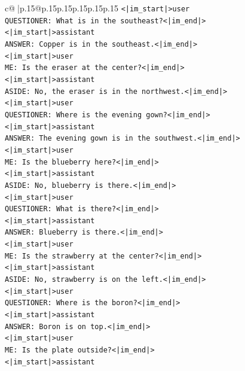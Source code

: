 \documentclass{article}
\begin{document}
{\begin{supertabular}{c@{$\;$}|p{.15\linewidth}@{}p{.15\linewidth}p{.15\linewidth}p{.15\linewidth}p{.15\linewidth}p{.15\linewidth}}
{{{\texttt{<|im\_start|>user} \\
\texttt{QUESTIONER: What is in the southeast?<|im\_end|>} \\
\texttt{<|im\_start|>assistant} \\
\texttt{ANSWER: Copper is in the southeast.<|im\_end|>} \\
\texttt{<|im\_start|>user} \\
\texttt{ME: Is the eraser at the center?<|im\_end|>} \\
\texttt{<|im\_start|>assistant} \\
\texttt{ASIDE: No, the eraser is in the northwest.<|im\_end|>} \\
\texttt{<|im\_start|>user} \\
\texttt{QUESTIONER: Where is the evening gown?<|im\_end|>} \\
\texttt{<|im\_start|>assistant} \\
\texttt{ANSWER: The evening gown is in the southwest.<|im\_end|>} \\
\texttt{<|im\_start|>user} \\
\texttt{ME: Is the blueberry here?<|im\_end|>} \\
\texttt{<|im\_start|>assistant} \\
\texttt{ASIDE: No, blueberry is there.<|im\_end|>} \\
\texttt{<|im\_start|>user} \\
\texttt{QUESTIONER: What is there?<|im\_end|>} \\
\texttt{<|im\_start|>assistant} \\
\texttt{ANSWER: Blueberry is there.<|im\_end|>} \\
\texttt{<|im\_start|>user} \\
\texttt{ME: Is the strawberry at the center?<|im\_end|>} \\
\texttt{<|im\_start|>assistant} \\
\texttt{ASIDE: No, strawberry is on the left.<|im\_end|>} \\
\texttt{<|im\_start|>user} \\
\texttt{QUESTIONER: Where is the boron?<|im\_end|>} \\
\texttt{<|im\_start|>assistant} \\
\texttt{ANSWER: Boron is on top.<|im\_end|>} \\
\texttt{<|im\_start|>user} \\
\texttt{ME: Is the plate outside?<|im\_end|>} \\
\texttt{<|im\_start|>assistant} \\
}}}
\end{supertabular}}
\end{document}
